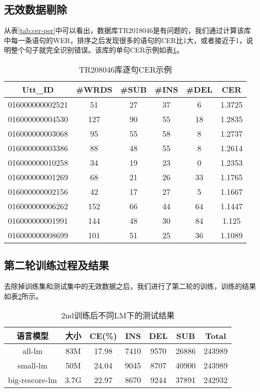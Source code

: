 \subsection{无效数据剔除}
从表\ref{tab:cer-per}中可以看出，数据库TR2018046是有问题的，我们通过计算该库中每一条语句的WER，排序之后发现很多的语句的CER比1大，或者接近于1，说明整个句子就完全识别错误。该库的单句CER示例如表\ref{tab:tr2018046}。
\begin{table}[h]
 \centering
 \caption{TR208046库逐句CER示例}
	 \begin{tabular*}{1\textwidth}{@{\extracolsep{\fill}}cccccc}
	 \toprule
		{\bf Utt\_ID  }  & {\bf #WRDS   } & {\bf #SUB    } & {\bf #INS    } & {\bf #DEL    } & {\bf CER} \\
	 \midrule
		016000000002521    & 	51     & 	27    &  	37    &  	6     &  	1.3725 \\
		016000000004530    & 	127    & 	90    &  	55    &  	18    &  	1.2835 \\
		016000000003068    & 	95     & 	55    &  	58    &  	8     &  	1.2737 \\
		016000000003386    & 	88     & 	48    &  	55    &  	8     &  	1.2614 \\
		016000000010258    & 	34     & 	19    &  	23    &  	0     &  	1.2353 \\
		016000000001269    & 	68     & 	21    &  	26    &  	33    &  	1.1765 \\
		016000000002156    & 	42     & 	17    &  	27    &  	5     &  	1.1667 \\
		016000000006262    & 	152    & 	66    &  	44    &  	64    &  	1.1447 \\
		016000000001991    & 	144    & 	48    &  	30    &  	84    &  	1.125  \\
		016000000008699    & 	101    & 	51    &  	25    &  	36    &  	1.1089 \\
	 \bottomrule
	 \end{tabular*}%
 \label{tab:tr2018046}%
\end{table}%



\subsection{第二轮训练过程及结果}
去除掉训练集和测试集中的无效数据之后，我们进行了第二轮的训练，训练的结果如表\ref{tab:second-train}所示。
\begin{table}[h]
 \centering
 \caption{2nd训练后不同LM下的测试结果}
	 \begin{tabular*}{1\textwidth}{@{\extracolsep{\fill}}ccccccc}
	 \toprule
		{\bf 语言模型} & {\bf 大小} & {\bf CE(\%)} &{\bf INS} &{\bf DEL}  &{\bf SUB} &{\bf Total}\\
	 \midrule
	   all-lm         &  83M   & 17.98   &  7410  &  9570  & 26886  & 243989 \\
	   small-lm       &  50M   & 24.04   &  9045  &   8707 & 40900  & 243989 \\
	   big-rescore-lm &  3.7G  & 22.97   &  8670  &   9244 & 37891  & 242932 \\
	 \bottomrule
	 \end{tabular*}%
 \label{tab:second-train}%
\end{table}%

